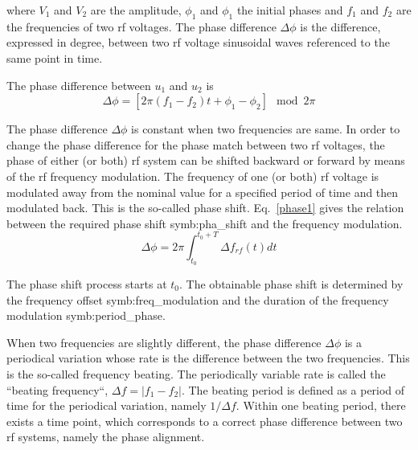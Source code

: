 where $V_1$ and $V_2$ are the amplitude, $\phi_1$ and $\phi_1$ the initial phases and $f_1$ and $f_2$ are the frequencies of two rf voltages. The phase difference $\Delta \phi$ is the difference, expressed in degree, between two rf voltage sinusoidal waves referenced to the same point in time. 


The phase difference between $u_1$ and $u_2$ is
\begin{equation}
	\Delta \phi=[2\pi(f_1-f_2)t+\phi_1-\phi_2] \mod 2\pi\label{phase_diff_general}
\end{equation}

The phase difference $\Delta \phi$ is constant when two frequencies are same. In order to change the phase difference for the phase match between two rf voltages, the phase of either (or both) rf system can be shifted backward or forward by means of the rf frequency modulation. The frequency of one (or both) rf voltage is modulated away from the nominal value for a specified period of time and then modulated back. This is the so-called phase shift. Eq.~\ref{phase1} gives the relation between the required phase shift \gls{symb:pha_shift} and the frequency modulation. 
\begin{equation}
\Delta \phi= 2\pi \int_{t_0}^{t_0+T} \Delta f_{rf}(t)dt \label{phase1}
\end{equation}

The phase shift process starts at $t_0$. The obtainable phase shift is determined by the frequency offset \gls{symb:freq_modulation} and the duration of the frequency modulation \gls{symb:period_phase}. 

When two frequencies are slightly different, the phase difference $\Delta \phi$ is a periodical variation whose rate is the difference between the two frequencies. This is the so-called frequency beating. The periodically variable rate is called the ``beating frequency``, $\Delta f=|f_1-f_2|$. The beating period is defined as a period of time for the periodical variation, namely $1/\Delta f$. Within one beating period, there exists a time point, which corresponds to a correct phase difference between two rf systems, namely the phase alignment. 

